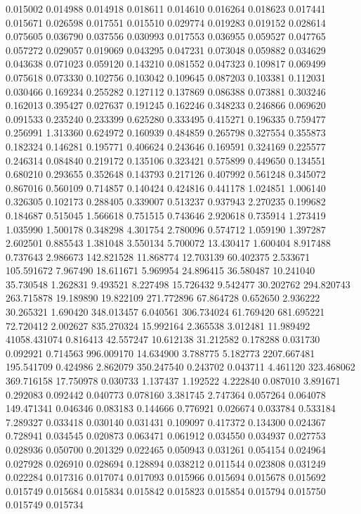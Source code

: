 0.015002
0.014988
0.014918
0.018611
0.014610
0.016264
0.018623
0.017441
0.015671
0.026598
0.017551
0.015510
0.029774
0.019283
0.019152
0.028614
0.075605
0.036790
0.037556
0.030993
0.017553
0.036955
0.059527
0.047765
0.057272
0.029057
0.019069
0.043295
0.047231
0.073048
0.059882
0.034629
0.043638
0.071023
0.059120
0.143210
0.081552
0.047323
0.109817
0.069499
0.075618
0.073330
0.102756
0.103042
0.109645
0.087203
0.103381
0.112031
0.030466
0.169234
0.255282
0.127112
0.137869
0.086388
0.073881
0.303246
0.162013
0.395427
0.027637
0.191245
0.162246
0.348233
0.246866
0.069620
0.091533
0.235240
0.233399
0.625280
0.333495
0.415271
0.196335
0.759477
0.256991
1.313360
0.624972
0.160939
0.484859
0.265798
0.327554
0.355873
0.182324
0.146281
0.195771
0.406624
0.243646
0.169591
0.324169
0.225577
0.246314
0.084840
0.219172
0.135106
0.323421
0.575899
0.449650
0.134551
0.680210
0.293655
0.352648
0.143793
0.217126
0.407992
0.561248
0.345072
0.867016
0.560109
0.714857
0.140424
0.424816
0.441178
1.024851
1.006140
0.326305
0.102173
0.288405
0.339007
0.513237
0.937943
2.270235
0.199682
0.184687
0.515045
1.566618
0.751515
0.743646
2.920618
0.735914
1.273419
1.035990
1.500178
0.348298
4.301754
2.780096
0.574712
1.059190
1.397287
2.602501
0.885543
1.381048
3.550134
5.700072
13.430417
1.600404
8.917488
0.737643
2.986673
142.821528
11.868774
12.703139
60.402375
2.533671
105.591672
7.967490
18.611671
5.969954
24.896415
36.580487
10.241040
35.730548
1.262831
9.493521
8.227498
15.726432
9.542477
30.202762
294.820743
263.715878
19.189890
19.822109
271.772896
67.864728
0.652650
2.936222
30.265321
1.690420
348.013457
6.040561
306.734024
61.769420
681.695221
72.720412
2.002627
835.270324
15.992164
2.365538
3.012481
11.989492
41058.431074
0.816413
42.557247
10.612138
31.212582
0.178288
0.031730
0.092921
0.714563
996.009170
14.634900
3.788775
5.182773
2207.667481
195.541709
0.424986
2.862079
350.247540
0.243702
0.043711
4.461120
323.468062
369.716158
17.750978
0.030733
1.137437
1.192522
4.222840
0.087010
3.891671
0.292083
0.092442
0.040773
0.078160
3.381745
2.747364
0.057264
0.064078
149.471341
0.046346
0.083183
0.144666
0.776921
0.026674
0.033784
0.533184
7.289327
0.033418
0.030140
0.031431
0.109097
0.417372
0.134300
0.024367
0.728941
0.034545
0.020873
0.063471
0.061912
0.034550
0.034937
0.027753
0.028936
0.050700
0.201329
0.022465
0.050943
0.031261
0.054154
0.024964
0.027928
0.026910
0.028694
0.128894
0.038212
0.011544
0.023808
0.031249
0.022284
0.017316
0.017074
0.017093
0.015966
0.015694
0.015678
0.015692
0.015749
0.015684
0.015834
0.015842
0.015823
0.015854
0.015794
0.015750
0.015749
0.015734
